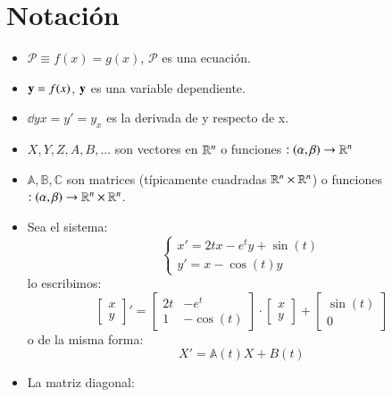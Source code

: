 
\chapter{Notaci\'{o}n}
\begin{multicols}{2}
    \begin{itemize}
        \item $ \mathcal{P} \equiv f(x) = g(x)$, $\mathcal{P}$ es una ecuación.
        \item $\mathbf{y} = f(x)$, $\mathbf{y}$ es una variable dependiente.
        \item $\dd{y}{x} = y' = y_x$ es la derivada de y respecto de x.
        \item $X, Y, Z, A, B, ...$ son vectores en $\mathbb{R}^n$ o funciones $:(\alpha, \beta) \to \mathbb{R}^n$
        \item $\mathbb{A}, \mathbb{B}, \mathbb{C}$ son matrices (típicamente cuadradas $\mathbb{R}^n \times \mathbb{R}^n$) o funciones $:(\alpha, \beta) \to \mathbb{R}^n \times \mathbb{R}^n$.
        \item Sea el sistema:
        $$
            \begin{cases}
                x' = 2tx - e^ty + \sin(t)\\
                y' = x - \cos(t) y
            \end{cases}
        $$
        lo escribimos:
        $$
            \left[
            \begin{matrix}
                x\\
                y
            \end{matrix}\right]' =
            \left[
            \begin{matrix}
                2t & -e^t\\
                1 & -\cos(t)
            \end{matrix}\right] \cdot
            \left[
            \begin{matrix}
                x\\
                y
            \end{matrix}
            \right]
            +
            \left[
            \begin{matrix}
                \sin(t)\\
                0
            \end{matrix}
            \right]
        $$
        o de la misma forma:
        $$
        X' = \mathbb{A}(t) X + B(t)
        $$
        \item La matriz diagonal:

\end{itemize}
\end{multicols}
